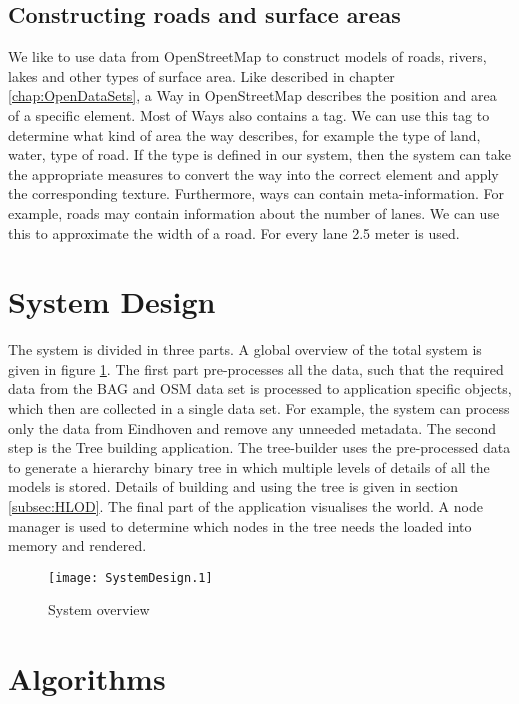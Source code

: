 \subsection{Constructing roads and surface areas}
We like to use data from OpenStreetMap to construct models of roads, rivers, lakes and other types of surface area. Like described in chapter \ref{chap:OpenDataSets}, a Way in OpenStreetMap describes the position and area of a specific element. Most of Ways also contains a tag. We can use this tag to determine what kind of area the way describes, for example the type of land, water, type of road. If the type is defined in our system, then the system can take the appropriate measures to convert the way into the correct element and apply the corresponding texture. Furthermore, ways can contain meta-information. For example, roads may contain information about the number of lanes. We can use this to approximate the width of a road. For every lane 2.5 meter is used.

\section{System Design}
\label{sec:SystemDesign}
The system is divided in three parts. A global overview of the total system is given in figure \ref{fig:sys_overview}. The first part pre-processes all the data, such that the required data from the BAG and OSM data set is processed to application specific objects, which then are collected in a single data set. For example, the system can process only the data from Eindhoven and remove any unneeded metadata. The second step is the Tree building application. The tree-builder uses the pre-processed data to generate a hierarchy binary tree in which multiple levels of details of all the models is stored. Details of building and using the tree is given in section \ref{subsec:HLOD}. The final part of the application visualises the world. A node manager is used to determine which nodes in the tree needs the loaded into memory and rendered.
\begin{figure}[htb!]
    \centering
    \ifPDFTeX
        \texttt{[image: SystemDesign.1]}
    \fi
    \caption{System overview}
    \label{fig:sys_overview}
\end{figure}

\section{Algorithms}
\label{sec:Algorithms}



